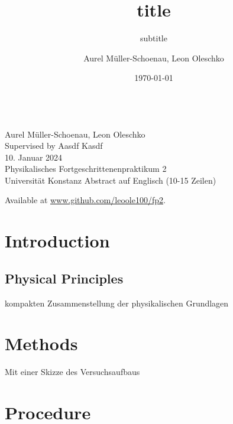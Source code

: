 \documentclass[
    parskip=half, 
    twoside=false,
    twocolumn=true,
    fontsize=11pt,
]{scrarticle}
\begin{document}
\title{title}
\subtitle{subtitle}
\author{Aurel Müller-Schoenau, Leon Oleschko}
\date{\dotdate\today}


\begin{titlepage}
    \sffamily
    \vspace*{3cm}
    {
        \fontsize{32}{32}
    }
    \vspace{.25cm}\\
    {
        \Large
        Aurel Müller-Schoenau, Leon Oleschko\\
        Supervised by Aasdf Kasdf
        \vspace{.05cm}\\
        10. Januar 2024
        \vspace{.25cm}\\
        \normalsize
        Physikalisches Fortgeschrittenenpraktikum 2\\
        Universität Konstanz
    }
    \vfill
    {
        \normalfont\normalsize
        Abstract auf Englisch (10-15 Zeilen)
        \blindtext[2]
    }
    \vfill
    \begin{flushright}
        Available at \url{www.github.com/leoole100/fp2}.
    \end{flushright}
\end{titlepage}

\section{Introduction}
\blindtext

\subsection{Physical Principles}
kompakten Zusammenstellung der physikalischen Grundlagen
\blindtext

\section{Methods}
Mit einer Skizze des Versuchsaufbaus
\blindtext[3]

\section{Procedure}
\blindtext[5]

\pagebreak
\end{document}
